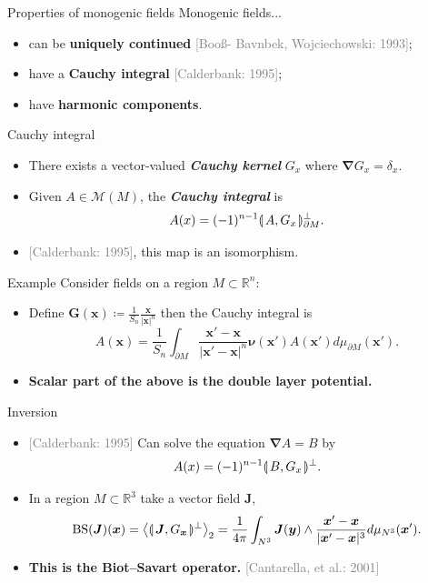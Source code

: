 \documentclass[aspectratio=169]{beamer}
\newcommand\boldgreen[1]{\textcolor{lighter_csu_green}{\emph{\textbf{#1}}}}
\newcommand\boldgold[1]{\textcolor{csu_gold}{\textbf{#1}}}
\newcommand\grey[1]{\textcolor{gray}{#1}}
\newcommand{\directedintproduct}[2]{\llparenthesis \hspace*{.5mm}#1 , #2\hspace*{.5mm} \rrparenthesis}
\newcommand{\R}{\mathbb{R}}
\newcommand{\grad}{\boldsymbol{\nabla}}
\newcommand{\monogenics}{\mathcal{M}}
\newcommand{\blade}[1]{\boldsymbol{#1}}
\newcommand{\boundary}{{\partial M}}
\newcommand{\normal}{\blade{\nu}}
\DeclarePairedDelimiter\angles{\langle}{\rangle}
\newcommand{\proj}[2]{\angles*{#2}_{#1}}
\begin{document}
\begin{frame}{Properties of monogenic fields}
\vfill
Monogenic fields...
\begin{itemize}
  \pause
  \item can be \boldgold{uniquely continued} \grey{[Boo\ss - Bavnbek, Wojciechowski: 1993]};
  \pause
  \item have a \boldgold{Cauchy integral} \grey{[Calderbank: 1995]};
  \pause
  \item have \boldgold{harmonic components}.
\end{itemize}
\vfill
\end{frame}

\begin{frame}{Cauchy integral}
\vfill
\begin{itemize}
\pause
\item There exists a vector-valued \boldgreen{Cauchy kernel} $G_x$ where $\grad G_x = \delta_x$.
\pause
\item Given $A\in \monogenics(M)$, the \boldgreen{Cauchy integral} is
\[
A(x)=(-1)^{n-1}\directedintproduct{A}{G_x}_{\boundary}^\perp.
\]
\pause
\item \grey{[Calderbank: 1995]}, this map is an isomorphism.
\end{itemize}
\vfill
\end{frame}

\begin{frame}{Example}
\vfill
Consider fields on a region $M\subset \R^n$:
\begin{itemize}
\pause
\item Define $\blade{G}(\blade{x}) \coloneqq \frac{1}{S_n}\frac{\blade{x}}{|\blade{x}|^n}$ then the Cauchy integral is
\[
A(\blade{x}) = \frac{1}{S_n} \int_\boundary \frac{\blade{x}' - \blade{x}}{|\blade{x}' - \blade{x}|^n}\normal(\blade{x}') A(\blade{x}') d \mu_{\boundary}(\blade{x}').
\]
\pause
\item \boldgold{Scalar part of the above is the double layer potential.}
\end{itemize}
\vfill
\end{frame}

\begin{frame}{Inversion}
\vfill
\begin{itemize}
  \pause
  \item \grey{[Calderbank: 1995]} Can solve the equation $\grad A=B$ by
\[
A(x) = (-1)^{n-1}\directedintproduct{B}{G_x}^\perp.
\]
  \pause
  \item In a region $M\subset \R^3$ take a vector field $\blade{J}$,
  \[
  \operatorname{BS}(\blade{J})(\blade{x}) = \proj{2}{\directedintproduct{\blade{J}}{G_{\blade{x}}}^\perp} = \frac{1}{4\pi} \int_{N^3} \blade{J}(\blade{y}) \wedge \frac{\blade{x}'-\blade{x}}{|\blade{x}'-\blade{x}|^{3}} d\mu_{N^3}(\blade{x}').
  \]
  \pause
  \item \boldgold{This is the Biot--Savart operator.} \grey{[Cantarella, et al.: 2001]}
  \end{itemize}
\vfill
\end{frame}
\end{document}
